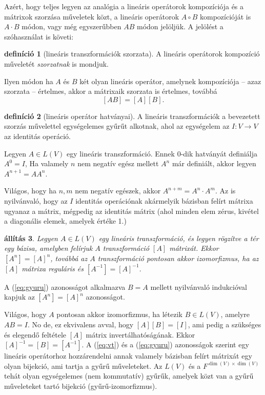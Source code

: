 \documentclass[9pt, a4paper, showtrims]{memoir}
\makeatletter
\renewenvironment{proof}[1][\proofname]
    {\par\pushQED{\qed}%
    \normalfont \topsep6\p@\@plus6\p@\relax
    \trivlist
    \item[\hskip\labelsep
        \itshape
    #1\@addpunct{:}]\ignorespaces}
    {\popQED\endtrivlist\@endpefalse}
\theoremstyle{plain}
\newtheorem{proposition}{állítás}[chapter]
\theoremstyle{remark}
\theoremstyle{definition}
\newtheorem{definition}[proposition]{definíció}
\makeatother
\begin{document}
Azért, hogy teljes legyen az analógia a lineáris operátorok kompozíciója és a mátrixok szorzása műveletek közt,
a lineáris operátorok $A\circ B$ kompozícióját is $A\cdot B$ módon, vagy még egyszerűbben $AB$ módon jelöljük.
A jelölést a szóhasználat is követi:
\begin{definition}[lineáris transzformációk szorzata]
	A lineáris operátorok kompozíció műveletét \emph{szorzatnak} is mondjuk.
\end{definition}
\noindent Ilyen módon ha $A$ és $B$ két olyan lineáris operátor, amelynek kompozíciója -- azaz szorzata -- értelmes,
akkor a mátrixaik szorzata is értelmes, továbbá
\begin{equation}\label{eq:gyuru}
	[AB]=[A][B].
\end{equation}
\begin{definition}[lineáris operátor hatványai]
	A lineáris transzformációk a bevezetett szorzás művelettel egységelemes gyűrűt alkotnak,
	ahol az egységelem az
	$I:V\to V$ az identitás operáció.

	Legyen $A\in L\left( V \right)$ egy lineáris transzformáció.
	Ennek $0$-dik hatványát definiálja $A^0=I$,
	Ha valamely $n$ nem negatív egész mellett $A^n$ már definiált,
	akkor legyen $A^{n+1}=AA^n$.
\end{definition}
Világos, hogy ha $n,m$ nem negatív egészek, akkor $A^{n+m}=A^n\cdot A^m$.
Az is nyilvánvaló, hogy az $I$ identitás operációnak akármelyik bázisban felírt mátrixa ugyanaz a mátrix,
mégpedig az identitás mátrix (ahol minden elem zérus, kivétel a diagonális elemek, amelyek értéke 1.)
\begin{proposition}
	Legyen $A\in L\left( V \right)$ egy lineáris transzformáció, és legyen rögzítve a tér egy bázisa,
	amelyben felírjuk $A$ transzformáció $[A]$ mátrixát.
	Ekkor
	\(
	\left[ A^n \right]=\left[ A \right]^n
	\),
	továbbá az $A$ transzformáció pontosan akkor izomorfizmus, 
    ha az $[A]$ mátrixa reguláris és
	\begin{math}
		\left[ A^{-1} \right]
		=
		\left[ A \right]^{-1}.
	\end{math}
\end{proposition}
\begin{proof}
	A (\ref{eq:gyuru}) azonosságot alkalmazva $B=A$ mellett nyilvánvaló indukcióval kapjuk az
	$\left[ A^n \right]=\left[ A \right]^n$
	azonosságot.

	Világos, hogy $A$ pontosan akkor izomorfizmus,
	ha létezik $B\in L\left( V \right)$, amelyre $AB=I$.
	No de, ez ekvivalens avval, hogy $[A][B]=[I]$, ami pedig a szükséges és elegendő feltétele
	$[A]$ mátrix invertálhatóságának.
	Ekkor $[A]^{-1}=[B]=\left[ A^{-1} \right]$.
\end{proof}
A (\ref{eq:vt}) és a (\ref{eq:gyuru}) azonosságok szerint 
egy lineáris operátorhoz hozzárendelni annak valamely bázisban
felírt mátrixát egy olyan bijekció, ami tartja a gyűrű műveleteket.
Az $L\left( V \right)$ és a $F^{\dim(V)\times \dim(V)}$ tehát olyan egységelemes (nem kommutatív) gyűrűk,
amelyek közt van a gyűrű műveleteket tartó bijekció (gyűrű-izomorfizmus).
\end{document}
